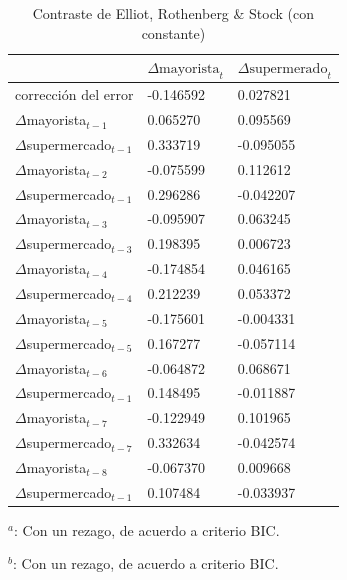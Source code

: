\documentclass[12pt, twoside]{book}\usepackage[]{graphicx}\usepackage[]{color}
\numberwithin{equation}{section}
\numberwithin{theorem}{section}
\numberwithin{teorema}{section}
\numberwithin{defi}{section}
\numberwithin{prop}{section}
\numberwithin{defi}{section}
\theoremstyle{plain}
\begin{document}
\begin{table}[!htpb]
\centering
\begin{threeparttable}
\caption{Contraste de Elliot, Rothenberg \& Stock (con constante)\label{fig5.6}}
\begin{tabular}{@{}lll@{}}
\toprule
 & $\Delta \text{mayorista}_{t} $ & $\Delta \text{supermerado}_{t}$ \\ 
 \midrule 
 $\text{corrección del error}$ & -0.146592   &  0.027821 \\     
$\Delta$mayorista$_{t-1}$   &   0.065270 &   0.095569  \\   
$\Delta$supermercado$_{t-1}$  & 0.333719  &  -0.095055 \\     
$\Delta$mayorista$_{t-2}$  & -0.075599  &   0.112612  \\   
$\Delta$supermercado$_{t-1}$  & 0.296286  &  -0.042207 \\     
$\Delta$mayorista$_{t-3}$ &  -0.095907  & 0.063245     \\
$\Delta$supermercado$_{t-3}$  & 0.198395  &   0.006723  \\   
$\Delta$mayorista$_{t-4}$   &  -0.174854  &   0.046165 \\     
$\Delta$supermercado$_{t-4}$  & 0.212239  &   0.053372  \\   
$\Delta$mayorista$_{t-5}$   &  -0.175601  &  -0.004331 \\     
$\Delta$supermercado$_{t-5}$  & 0.167277  &  -0.057114  \\   
$\Delta$mayorista$_{t-6}$   & -0.064872   &  0.068671 \\     
$\Delta$supermercado$_{t-1}$  & 0.148495  &  -0.011887 \\     
$\Delta$mayorista$_{t-7}$   &  -0.122949  &   0.101965 \\     
$\Delta$supermercado$_{t-7}$  & 0.332634  &  -0.042574  \\   
$\Delta$mayorista$_{t-8}$   &  -0.067370  &   0.009668  \\   
$\Delta$supermercado$_{t-1}$  & 0.107484  &  -0.033937  \\ 
\bottomrule
\end{tabular}
\label{tab-9}
\begin{tablenotes}
\small 
\item $^{a}$: Con un rezago, de acuerdo a criterio BIC. 
\item $^{b}$: Con un rezago, de acuerdo a criterio BIC. 
\end{tablenotes}
\end{threeparttable}
\end{table}
\end{document}
